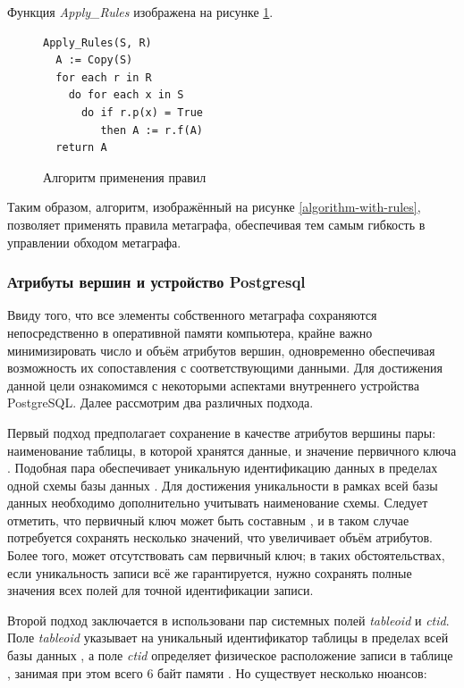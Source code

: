 Функция \textit{Apply\_Rules} изображена на рисунке \ref{apply-rules}.

\begin{figure}
  \begin{lstlisting}
Apply_Rules(S, R)
  A := Copy(S)
  for each r in R
    do for each x in S
      do if r.p(x) = True
         then A := r.f(A)
  return A
  \end{lstlisting}
  \caption{Алгоритм применения правил}
  \label{apply-rules}
\end{figure}

Таким образом, алгоритм, изображённый на рисунке \ref{algorithm-with-rules}, позволяет применять правила метаграфа, обеспечивая тем самым гибкость в управлении обходом метаграфа.

\subsubsection{Атрибуты вершин и устройство Postgresql}
Ввиду того, что все элементы собственного метаграфа сохраняются непосредственно в оперативной памяти компьютера, крайне важно минимизировать число и объём атрибутов вершин, одновременно обеспечивая возможность их сопоставления с соответствующими данными. Для достижения данной цели ознакомимся с некоторыми аспектами внутреннего устройства PostgreSQL. Далее рассмотрим два различных подхода.

Первый подход предполагает сохранение в качестве атрибутов вершины пары: наименование таблицы, в которой хранятся данные, и значение первичного ключа \cite{pg-pk}. Подобная пара обеспечивает уникальную идентификацию данных в пределах одной схемы базы данных \cite{pg-schemas}. Для достижения уникальности в рамках всей базы данных необходимо дополнительно учитывать наименование схемы. Следует отметить, что первичный ключ может быть составным \cite{pg-pk-composite}, и в таком случае потребуется сохранять несколько значений, что увеличивает объём атрибутов. Более того, может отсутствовать сам первичный ключ; в таких обстоятельствах, если уникальность записи всё же гарантируется, нужно сохранять полные значения всех полей для точной идентификации записи.

Второй подход заключается в использовани пар системных полей \textit{tableoid} и \textit{ctid}. Поле \textit{tableoid} указывает на уникальный идентификатор таблицы в пределах всей базы данных \cite{pg-tableoid}, а поле \textit{ctid} определяет физическое расположение записи в таблице \cite{pg-ctid}, занимая при этом всего 6 байт памяти \cite{pg-page-layout}. Но существует несколько нюансов:

